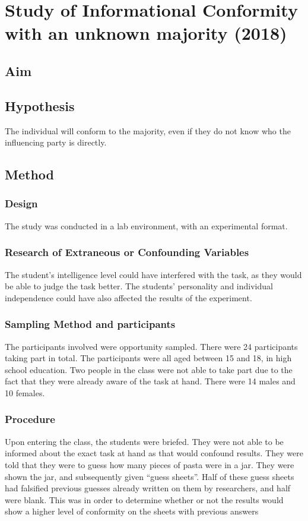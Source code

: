 \documentclass{article}
\begin{document}
\section{Study of Informational Conformity with an unknown majority (2018)}
\subsection {Aim}
\subsection{Hypothesis}
The individual will conform to the majority, even if they do not know who the influencing party is directly.
\subsection {Method}
\subsubsection{Design}
The study was conducted in a lab environment, with an experimental format.
\subsubsection{Research of Extraneous or Confounding Variables}
The student’s intelligence level could have interfered with the task, as they would be able to judge the task better. The students’ personality and individual independence could have also affected the results of the experiment.
\subsubsection{Sampling Method and participants}
The participants involved were opportunity sampled. There were 24 participants taking part in total. The participants were all aged between 15 and 18, in high school education. Two people in the class were not able to take part due to the fact that they were already aware of the task at hand. There were 14 males and 10 females.
\subsubsection{Procedure}
Upon entering the class, the students were briefed. They were not able to be informed about the exact task at hand as that would confound results. They were told that they were to guess how many pieces of pasta were in a jar. They were shown the jar, and subsequently given “guess sheets”. Half of these guess sheets had falsified previous guesses already written on them by researchers, and half were blank. This was in order to determine whether or not the results would show a higher level of conformity on the sheets with previous answers
\begin{center}
\end{center}
\end{document}
